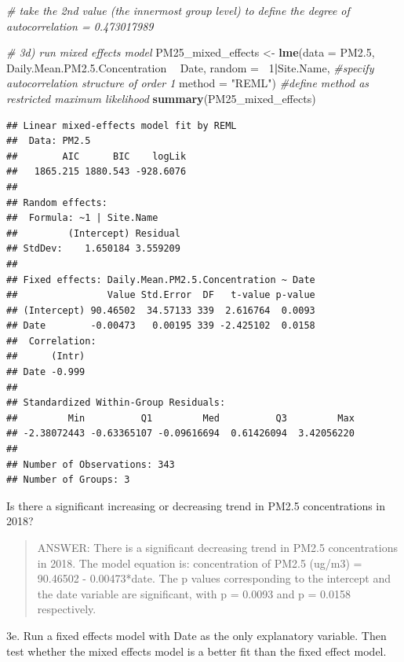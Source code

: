 \documentclass[]{article}
\newenvironment{Shaded}{\begin{snugshade}}{\end{snugshade}}
\newcommand{\KeywordTok}[1]{\textcolor[rgb]{0.13,0.29,0.53}{\textbf{#1}}}
\newcommand{\DataTypeTok}[1]{\textcolor[rgb]{0.13,0.29,0.53}{#1}}
\newcommand{\DecValTok}[1]{\textcolor[rgb]{0.00,0.00,0.81}{#1}}
\newcommand{\FloatTok}[1]{\textcolor[rgb]{0.00,0.00,0.81}{#1}}
\newcommand{\StringTok}[1]{\textcolor[rgb]{0.31,0.60,0.02}{#1}}
\newcommand{\CommentTok}[1]{\textcolor[rgb]{0.56,0.35,0.01}{\textit{#1}}}
\newcommand{\OperatorTok}[1]{\textcolor[rgb]{0.81,0.36,0.00}{\textbf{#1}}}
\newcommand{\NormalTok}[1]{#1}
\begin{document}
\begin{Shaded}
\begin{Highlighting}[]
\CommentTok{# take the 2nd value (the innermost group level) to define the degree of autocorrelation = 0.473017989}

\CommentTok{# 3d) run mixed effects model}
\NormalTok{PM25_mixed_effects <-}\StringTok{ }\KeywordTok{lme}\NormalTok{(}\DataTypeTok{data =}\NormalTok{ PM2.}\DecValTok{5}\NormalTok{,}
\NormalTok{                     Daily.Mean.PM2.}\FloatTok{5.}\NormalTok{Concentration }\OperatorTok{~}\StringTok{ }\NormalTok{Date, }
                     \DataTypeTok{random =} \OperatorTok{~}\DecValTok{1}\OperatorTok{|}\NormalTok{Site.Name, }\CommentTok{#specify autocorrelation structure of order 1}
                     \DataTypeTok{method =} \StringTok{"REML"}\NormalTok{) }\CommentTok{#define method as restricted maximum likelihood}
\KeywordTok{summary}\NormalTok{(PM25_mixed_effects)}
\end{Highlighting}
\end{Shaded}

\begin{verbatim}
## Linear mixed-effects model fit by REML
##  Data: PM2.5 
##        AIC      BIC    logLik
##   1865.215 1880.543 -928.6076
## 
## Random effects:
##  Formula: ~1 | Site.Name
##         (Intercept) Residual
## StdDev:    1.650184 3.559209
## 
## Fixed effects: Daily.Mean.PM2.5.Concentration ~ Date 
##                Value Std.Error  DF   t-value p-value
## (Intercept) 90.46502  34.57133 339  2.616764  0.0093
## Date        -0.00473   0.00195 339 -2.425102  0.0158
##  Correlation: 
##      (Intr)
## Date -0.999
## 
## Standardized Within-Group Residuals:
##         Min          Q1         Med          Q3         Max 
## -2.38072443 -0.63365107 -0.09616694  0.61426094  3.42056220 
## 
## Number of Observations: 343
## Number of Groups: 3
\end{verbatim}

Is there a significant increasing or decreasing trend in PM2.5
concentrations in 2018?

\begin{quote}
ANSWER: There is a significant decreasing trend in PM2.5 concentrations
in 2018. The model equation is: concentration of PM2.5 (ug/m3) =
90.46502 - 0.00473*date. The p values corresponding to the intercept and
the date variable are significant, with p = 0.0093 and p = 0.0158
respectively.
\end{quote}

3e. Run a fixed effects model with Date as the only explanatory
variable. Then test whether the mixed effects model is a better fit than
the fixed effect model.
\end{document}
